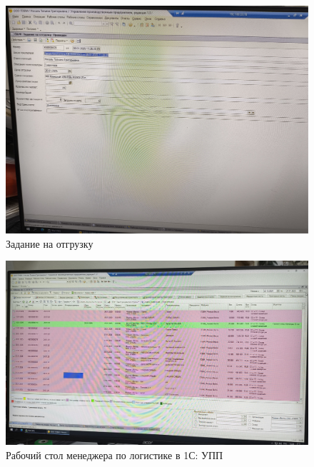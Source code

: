 \begin{figure}
\begin{center}
 \includegraphics[height=0.45\textheight, keepaspectratio]{Pics/Х задание на отгрузку.jpg}
\end{center}
 \caption{Задание на отгрузку}
 \label{pic:Х задание на отгрузку}
\end{figure}


\begin{figure}
\begin{center}
 \includegraphics[height=0.4\textheight, keepaspectratio]{Pics/Х рабочее место логиста.jpg}
\end{center}
 \caption{Рабочий стол менеджера по логистике в 1С: УПП}
 \label{pic:Х рабочее место логиста}
\end{figure}


